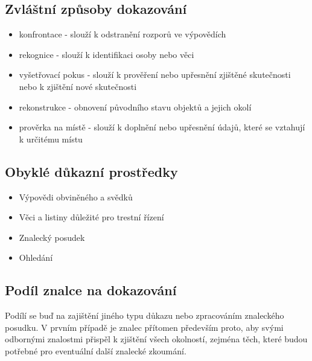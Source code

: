 \subsection{Zvláštní způsoby dokazování}
\begin{itemize}
    \item konfrontace - slouží k odstranění rozporů ve výpovědích
    \item rekognice - slouží k identifikaci osoby nebo věci
    \item vyšetřovací pokus - slouží k prověření nebo upřesnění zjištěné skutečnosti nebo k zjištění nové skutečnosti
    \item rekonstrukce - obnovení původního stavu objektů a jejich okolí
    \item prověrka na místě - slouží k doplnění nebo upřesnění údajů, které se vztahují k určitému místu
\end{itemize}
\subsection{Obyklé důkazní prostředky}
\begin{itemize}
    \item Výpovědi obviněného a svědků
    \item Věci a listiny důležité pro trestní řízení
    \item Znalecký posudek
    \item Ohledání
\end{itemize}
\subsection{Podíl znalce na dokazování}
Podílí se buď na zajištění jiného typu důkazu nebo zpracováním znaleckého posudku. V prvním případě je znalec přítomen především proto, aby svými odbornými
znalostmi přispěl k zjištění všech okolností, zejména těch, které budou potřebné pro eventuální další znalecké zkoumání. 